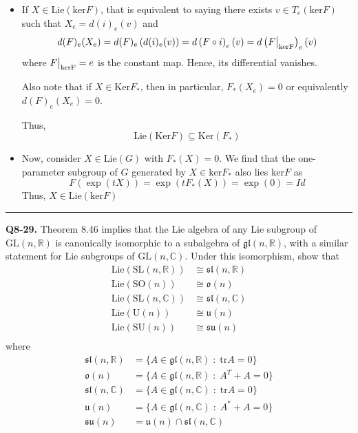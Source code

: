 \documentclass{article}
\newcommand{\R}{\mathbb{R}}
\newcommand{\C}{\mathbb{C}}
\newcommand{\restr}[2]{{%
  \left.\kern-\nulldelimiterspace %
  #1 %
  \vphantom{\big|} %
  \right|_{#2} %
  }}
\begin{document}
\begin{itemize}
  \item If $X \in \mathrm{Lie}(\mathrm{ker} F)$, that is equivalent to saying there exists $v \in T_e \left(\mathrm{ker} F\right)$ such that $X_e = d(i)_e (v)$ and 
  \[ d(F)_e(X_e) = d(F)_e \left(d(i)_e(v)\right) = d\left(F \circ i\right)_e (v) = d\left(\restr{F}{\mathrm{ker F}}\right)_e (v)  \]
  where $\restr{F}{\mathrm{ker F}} = e$ is the constant map. Hence, its differential vanishes.

  
  Also note that if $X \in \mathrm{Ker }F_*$, then in particular, $F_*(X_e) = 0$ or equivalently $d(F)_e(X_e) = 0$.
  

  Thus, \[ \mathrm{Lie}(\mathrm{Ker}F) \subseteq \mathrm{Ker}(F_*) \]

  \item Now, consider $X \in \mathrm{Lie}(G)$ with $F_*(X) = 0$. We find that the one-parameter subgroup of $G$ generated by $X \in \mathrm{ker} F_*$ also lies  $\mathrm{ker} F$ as  
  \[ F\left(\exp(tX)\right) = \exp\left(tF_*(X)\right) = \exp(0) = Id \] Thus, $X \in \mathrm{Lie}\left(\mathrm{ker} F\right)$
\end{itemize}

\vskip 0.5cm
\hrule 
\vskip 0.5cm




\textbf{Q8-29.} Theorem 8.46 implies that the Lie algebra of any Lie subgroup of $\mathrm{GL}(n, \R)$ is canonically isomorphic to a subalgebra of $\mathfrak{gl}(n, \R)$, with a similar statement for Lie subgroups of $\mathrm{GL}(n, \C)$. Under this isomorphism, show that 
\begin{align*}
  \mathrm{Lie}\left(\mathrm{SL}(n, \R)\right) &\cong \mathfrak{sl}(n, \R) \\
  \mathrm{Lie}\left(\mathrm{SO}(n)\right) &\cong \mathfrak{o}(n) \\
  \mathrm{Lie}\left(\mathrm{SL}(n, \C)\right) &\cong \mathfrak{sl}(n, \C) \\
  \mathrm{Lie}\left(\mathrm{U}(n)\right) &\cong \mathfrak{u}(n) \\
  \mathrm{Lie}\left(\mathrm{SU}(n)\right) &\cong \mathfrak{su}(n) \\
\end{align*}
where
\begin{align*}
  \mathfrak{sl}(n, \R) &= \{ A \in \mathfrak{gl}(n, \R)\;:\; \mathrm{tr} A = 0 \} \\
  \mathfrak{o}(n) &= \{ A \in \mathfrak{gl}(n, \R)\;:\; A^T + A = 0 \} \\
  \mathfrak{sl}(n, \C) &= \{ A \in \mathfrak{gl}(n, \C)\;:\; \mathrm{tr} A = 0 \} \\
  \mathfrak{u}(n) &= \{ A \in \mathfrak{gl}(n, \C)\;:\; A^* + A = 0 \} \\
  \mathfrak{su}(n) &= \mathfrak{u}(n) \cap \mathfrak{sl}(n, \C) \\
\end{align*}
\end{document}
